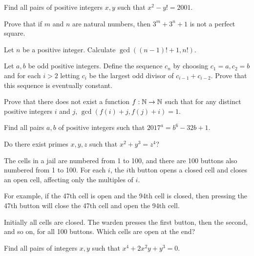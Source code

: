 \begin{problem}{\label{p:n:n:pr:63}}
  Find all pairs of positive integers $x,y$ such that $x^2-y!=2001$.
\end{problem}
\begin{problem}{\label{p:n:n:pr:64}}
  Prove that if $m$ and $n$ are natural numbers, then $3^m+3^n+1$ is not a
    perfect square.
\end{problem}
\begin{problem}{\label{p:n:n:pr:65}}
      Let $n$ be a positive integer. Calculate $\gcd((n-1)!+1,n!)$.
\end{problem}
\begin{problem}{\label{p:n:n:pr:66}}
  Let $a,b$ be odd positive integers. Define the sequence $c_n$ by
    choosing $c_1=a,c_2=b$ and for each $i>2$ letting $c_i$ be the largest odd
    divisor of $c_{i-1}+c_{i-2}$. Prove that this sequence is eventually
    constant.
\end{problem}
\begin{problem}{\label{p:n:n:pr:67}}
  Prove that there does not exist a function $f:\mathbb{N}\to\mathbb{N}$
    such that for any distinct positive integers $i$ and $j$,
    $\gcd(f(i)+j,f(j)+i)=1$.
\end{problem}
\begin{problem}{\label{p:n:n:pr:68}}
  Find all pairs $a,b$ of positive integers such that $2017^a=b^6-32b+1$.
\end{problem}
\begin{problem}{\label{p:n:n:pr:69}}
  Do there exist primes $x,y,z$ such that $x^2+y^3=z^4$?
\end{problem}
\begin{problem}{\label{p:n:n:pr:70}}
      The cells in a jail are numbered from 1 to 100, and there are 100
    buttons also numbered from 1 to 100. For each $i$, the $i$th button opens a
    closed cell and closes an open cell, affecting only the multiples of $i$. 

    For example, if the 47th cell is open and the 94th cell is closed, then
    pressing the 47th button will close the 47th cell and open the 94th cell.

    Initially all cells are closed.
    The warden presses the first button, then the second, and so on, for all
    100 buttons. Which cells are open at the end?
\end{problem}
\begin{problem}{\label{p:n:n:pr:71}}
  Find all pairs of integers $x,y$ such that $x^4+2x^2y+y^3=0$.
\end{problem}
